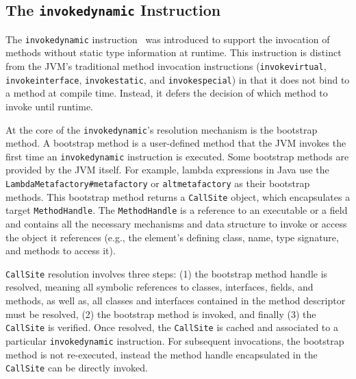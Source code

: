 

\subsection{The \texttt{invokedynamic} Instruction}
The \verb|invokedynamic| instruction~\cite{noauthor_java_nodate} was introduced to support the invocation of methods without static type information at runtime.
This instruction is distinct from the JVM's traditional method invocation instructions (\verb|invokevirtual|, \verb|invokeinterface|, \verb|invokestatic|, and \verb|invokespecial|) in that it does not bind to a method at compile time. Instead, it defers the decision of which method to invoke until runtime.

At the core of the \verb|invokedynamic|'s resolution mechanism is the bootstrap method. A bootstrap method is a user-defined method that the JVM invokes the first time an \verb|invokedynamic| instruction is executed. Some bootstrap methods are provided by the JVM itself. For example, lambda expressions in Java use the \verb|LambdaMetafactory#metafactory| or \verb|altmetafactory| as their bootstrap methods. 
This bootstrap method returns a \verb|CallSite| object, which encapsulates a target \verb|MethodHandle|. The \verb|MethodHandle| is a reference to an executable or a field and contains all the necessary mechanisms and data structure to invoke or access the object it references (e.g., the element's defining class, name, type signature, and methods to access it). 

\verb|CallSite| resolution involves three steps: (1) the bootstrap method handle is resolved, meaning all symbolic references to classes, interfaces, fields, and methods, as well as, all classes and interfaces contained in the method descriptor must be resolved, (2) the bootstrap method is invoked, and finally (3) the \verb|CallSite| is verified.
Once resolved, the \verb|CallSite| is cached and associated to a particular \verb|invokedynamic| instruction.
For subsequent invocations, the bootstrap method is not re-executed, instead the method handle encapsulated in the \verb|CallSite| can be directly invoked.


